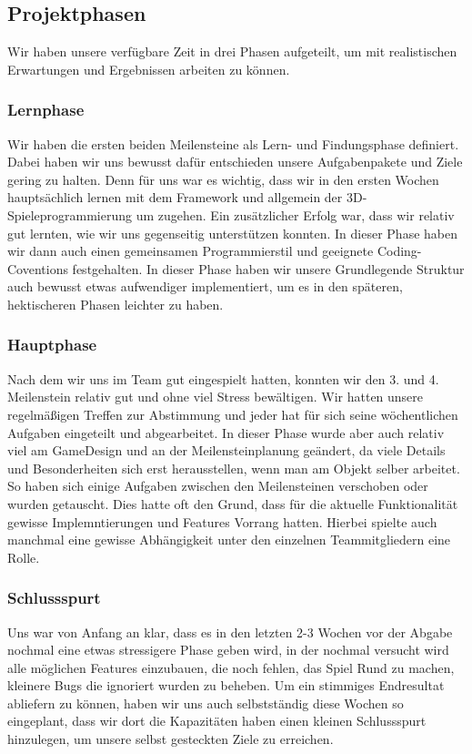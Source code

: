 \documentclass[12pt]{article}
\begin{document}
\subsection{Projektphasen}
Wir haben unsere verfügbare Zeit in drei Phasen aufgeteilt, um mit realistischen Erwartungen und Ergebnissen arbeiten zu können. \newline
\subsubsection{Lernphase}
Wir haben die ersten beiden Meilensteine als Lern- und Findungsphase definiert. Dabei haben wir uns bewusst dafür entschieden unsere Aufgabenpakete und Ziele gering zu halten.
Denn für uns war es wichtig, dass wir in den ersten Wochen hauptsächlich lernen mit dem Framework und allgemein der 3D-Spieleprogrammierung um zugehen. Ein zusätzlicher Erfolg war, dass wir relativ gut lernten, wie wir uns gegenseitig unterstützen konnten. In dieser Phase haben wir dann auch einen gemeinsamen Programmierstil und geeignete Coding-Coventions festgehalten. In dieser Phase haben wir unsere Grundlegende Struktur auch bewusst etwas aufwendiger implementiert, um es in den späteren, hektischeren Phasen leichter zu haben.

\subsubsection{Hauptphase}
Nach dem wir uns im Team gut eingespielt hatten, konnten wir den 3. und 4. Meilenstein relativ gut und ohne viel Stress bewältigen. Wir hatten unsere regelmäßigen Treffen zur Abstimmung und jeder hat für sich seine wöchentlichen Aufgaben eingeteilt und abgearbeitet. \newline
In dieser Phase wurde aber auch relativ viel am GameDesign und an der Meilensteinplanung geändert, da viele Details und Besonderheiten sich erst herausstellen, wenn man am Objekt selber arbeitet. So haben sich einige Aufgaben zwischen den Meilensteinen verschoben oder wurden getauscht. Dies hatte oft den Grund, dass für die aktuelle Funktionalität gewisse Implemntierungen und Features Vorrang hatten. Hierbei spielte auch manchmal eine gewisse Abhängigkeit unter den einzelnen Teammitgliedern eine Rolle.

\subsubsection{Schlussspurt}
Uns war von Anfang an klar, dass es in den letzten 2-3 Wochen vor der Abgabe nochmal eine etwas stressigere Phase geben wird, in der nochmal versucht wird alle möglichen Features einzubauen, die noch fehlen, das Spiel Rund zu machen, kleinere Bugs die ignoriert wurden zu beheben. Um ein stimmiges Endresultat abliefern zu können, haben wir uns auch selbstständig diese Wochen so eingeplant, dass wir dort die Kapazitäten haben einen kleinen Schlussspurt hinzulegen, um unsere selbst gesteckten Ziele zu erreichen.
\end{document}
